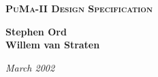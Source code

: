 \begin{titlepage}
\begin{center}

{\textsc{\Huge\bf PuMa-II Design Specification}} \\

\vspace{5cm}

{\Large\bf Stephen Ord \\[5mm]
	Willem van Straten} \\

\vspace{2cm}

{\it March 2002}

\end{center} 
\end{titlepage}
